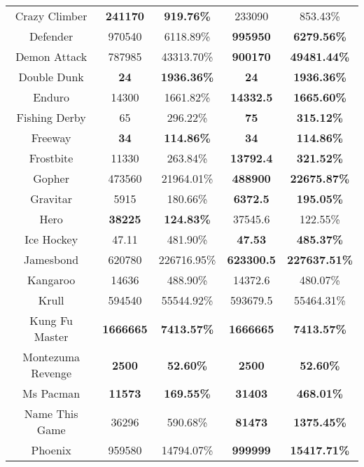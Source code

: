 \begin{table}[!hb]
\begin{center}
\begin{tabular}{c cc cc }
        Crazy Climber &\textbf{241170}	            &\textbf{919.76\%} & 233090 & 853.43\% \\  
        Defender &{970540}   &{6118.89\%} & \textbf{995950} & \textbf{6279.56\%} \\  
        Demon Attack &{787985}    &{43313.70\%} & \textbf{900170} & \textbf{49481.44\%} \\  
        Double Dunk &\textbf{{24 }}      &\textbf{{1936.36\%}} & \textbf{24} & \textbf{1936.36\%} \\  
        Enduro &14300             &1661.82\% & \textbf{14332.5} & \textbf{1665.60\%} \\  
        Fishing Derby &65               &296.22\% & \textbf{75} & \textbf{315.12\%} \\  
        Freeway &\textbf{{34}}      &\textbf{{114.86\%}} & \textbf{34} & \textbf{114.86\%} \\  
        Frostbite &11330	            &263.84\% & \textbf{13792.4} & \textbf{321.52\%} \\  
        Gopher &473560           &21964.01\% & \textbf{488900} & \textbf{22675.87\%} \\  
        Gravitar  &5915             &180.66\% & \textbf{6372.5} & \textbf{195.05\%} \\  
        Hero &\textbf{38225}	            &\textbf{124.83\%} & 37545.6 & 122.55\% \\  
        Ice Hockey &47.11           &481.90\% & \textbf{47.53} & \textbf{485.37\%} \\  
        Jamesbond &{620780	}  &{226716.95\%} & \textbf{623300.5} & \textbf{227637.51\%} \\  
        Kangaroo &14636           &488.90\% & 14372.6 & 480.07\% \\  
        Krull &{594540}          &{55544.92\%} & 593679.5 &55464.31\% \\  
        Kung Fu Master &\textbf{{1666665}}	          &\textbf{{7413.57\%}} & \textbf{1666665} & \textbf{7413.57\%} \\  
        Montezuma Revenge &\textbf{2500}            &\textbf{52.60\%} & \textbf{2500} & \textbf{52.60\%} \\  
        Ms Pacman &\textbf{11573}           &\textbf{169.55\%} & \textbf{31403} & \textbf{468.01\%} \\  
        Name This Game  &36296           &590.68\% & \textbf{81473} & \textbf{1375.45\%} \\  
        Phoenix &{959580 }         &	{14794.07\%} & \textbf{999999} & \textbf{15417.71\%} \\

\end{tabular}
\end{center}
\end{table}
